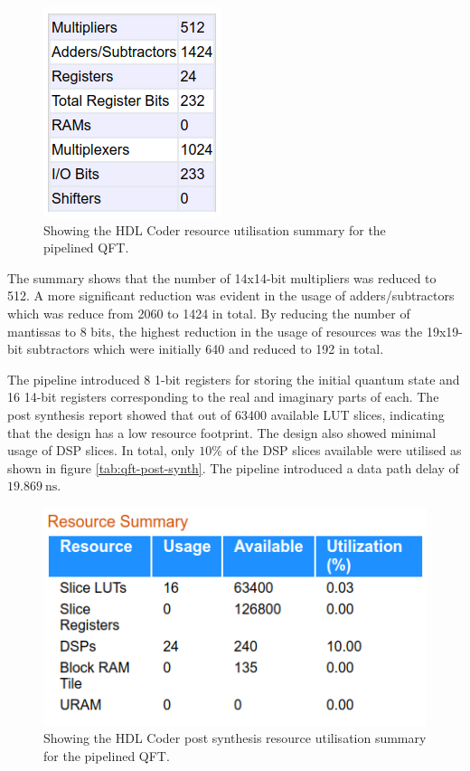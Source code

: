 \begin{figure}[!ht]
	\centering
	\includegraphics[width=0.55\linewidth]{body/ch6/figs/qft-summary-with-registers}
	\caption[Showing the HDL Coder Resource Utilisation Summary for the Pipelined QFT.]{Showing the HDL Coder resource utilisation summary for the pipelined QFT.}
	\label{fig:qft-summary-2}
\end{figure}
The summary shows that the number of 14x14-bit multipliers was reduced to 512. A more significant reduction was evident in the usage of adders/subtractors which was reduce from 2060 to 1424 in total. By reducing the number of mantissas to 8 bits, the highest reduction in the usage of resources was the 19x19-bit subtractors which were initially 640 and reduced to 192 in total.

The pipeline introduced 8 1-bit registers for storing the initial quantum state and 16 14-bit registers corresponding to the real and imaginary parts of each. The post synthesis report showed that out of 63400 available LUT slices, indicating that the design has a low resource footprint. The design also showed minimal usage of DSP slices. In total, only $10\%$ of the DSP slices available were utilised as shown in figure \ref{tab:qft-post-synth}. The pipeline introduced a data path delay of $\SI{19.869}{\nano\second}$. 

\begin{figure}[!ht]
	\centering
	\includegraphics[width=0.45\linewidth]{body/ch6/figs/qft-post-synth}
	\caption[Showing the HDL Coder Post Synthesis Resource Summary.]{Showing the HDL Coder post synthesis resource utilisation summary for the pipelined QFT.}
	\label{fig:qft-post-synth}
\end{figure}

